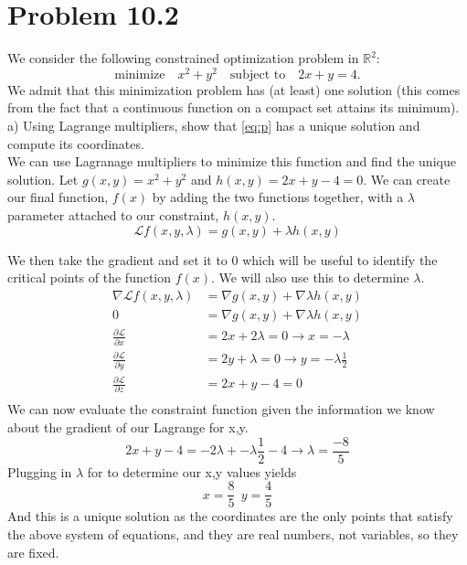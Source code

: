 \documentclass[12pt,twoside]{article}
\newcommand{\R}{\mathbb{R}}
\newcommand{\Lagr}{\mathcal{L}}
\begin{document}
\section{Problem 10.2}
	We consider the following constrained optimization problem in $\R^2$:
	\begin{equation}
		\label{eq:p}
	\text{minimize} \quad x^2 + y^2 \quad \text{subject to} \quad 2x +  y = 4.
	\end{equation}
	We admit that this minimization problem has (at least) one solution (this comes from the fact that a continuous function on a compact set attains its minimum).
	\\

a) Using Lagrange multipliers, show that \eqref{eq:p} has a unique solution and compute its coordinates.\\
We can use Lagranage multipliers to minimize this function and find the unique solution. Let $g(x,y) = x^2 + y^2$ and $h(x,y) = 2x + y - 4 = 0$. We can create our final function, $f(x)$ by adding the two functions together, with a $\lambda$ parameter attached to our constraint, $h(x,y)$.
$$
  \Lagr f(x,y,\lambda) = g(x,y) + \lambda h(x,y) 
$$

We then take the gradient and set it to 0 which will be useful to identify the critical points of the function $f(x)$. We will also use this to determine $\lambda$.
\begin{equation}
    \begin{split}
      \nabla \Lagr f(x,y,\lambda) &= \nabla g(x,y) + \nabla \lambda h(x,y)   \\
     0 &= \nabla g(x,y) + \nabla \lambda h(x,y)  \\
     \frac{\partial \Lagr}{\partial x} &= 2x + 2\lambda = 0 \rightarrow x = -\lambda\\
     \frac{\partial \Lagr}{\partial y} &= 2y + \lambda = 0 \rightarrow y = -\lambda\frac{1}{2} \\
     \frac{\partial \Lagr}{\partial z} &= 2x +y - 4 = 0\\
    \end{split}
\end{equation}
We can now evaluate the constraint function given the information we know about the gradient of our Lagrange for x,y.
$$
    2x +y -4 = -2\lambda + -\lambda \frac{1}{2} - 4 \rightarrow \lambda = \frac{-8}{5}
$$
Plugging in $\lambda$ for to determine our x,y values yields $$
x=\frac{8}{5} \ \ y=\frac{4}{5}$$
And this is a unique solution as the coordinates are the only points that satisfy the above system of equations, and they are real numbers, not variables, so they are fixed.
\end{document}

